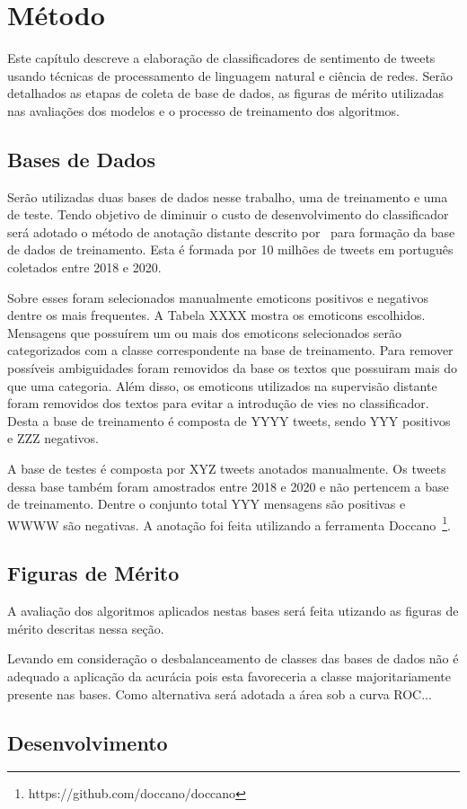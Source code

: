 \chapter{Método}
\label{chapter:method}

Este capítulo descreve a elaboração de classificadores de sentimento de tweets
usando técnicas de processamento de linguagem natural e ciência de redes.
Serão detalhados as etapas de coleta de base de dados, as figuras de mérito
utilizadas nas avaliações dos modelos e o processo de treinamento dos
algoritmos.

\section{Bases de Dados}

Serão utilizadas duas bases de dados nesse trabalho, uma de treinamento e uma de
teste.
Tendo objetivo de diminuir o custo de desenvolvimento do classificador será
adotado o método de anotação distante descrito por~\citet{go09} para formação da
base de dados de treinamento.
Esta é formada por 10 milhões de tweets em português coletados entre 2018 e 2020.

Sobre esses foram selecionados manualmente emoticons positivos e negativos
dentre os mais frequentes. A Tabela XXXX mostra os emoticons escolhidos.
Mensagens que possuírem um ou mais dos emoticons selecionados serão
categorizados com a classe correspondente na base de treinamento.
Para remover possíveis ambiguidades foram removidos da base os textos que
possuiram mais do que uma categoria.
Além disso, os emoticons utilizados na supervisão distante foram removidos dos
textos para evitar a introdução de vies no classificador.
Desta a base de treinamento é composta de YYYY tweets, sendo YYY positivos e ZZZ
negativos.

A base de testes é composta por XYZ tweets anotados manualmente.
Os tweets dessa base também foram amostrados entre 2018 e 2020 e não pertencem a
base de treinamento.
Dentre o conjunto total YYY mensagens são positivas e WWWW são negativas.
A anotação foi feita utilizando a ferramenta
Doccano~\footnote{https://github.com/doccano/doccano}.

\section{Figuras de Mérito}

A avaliação dos algoritmos aplicados nestas bases será feita utizando as figuras
de mérito descritas nessa seção.

Levando em consideração o desbalanceamento de classes das bases de dados não é
adequado a aplicação da acurácia pois esta favoreceria a classe majoritariamente
presente nas bases.
Como alternativa será adotada a área sob a curva ROC...

\section{Desenvolvimento}
